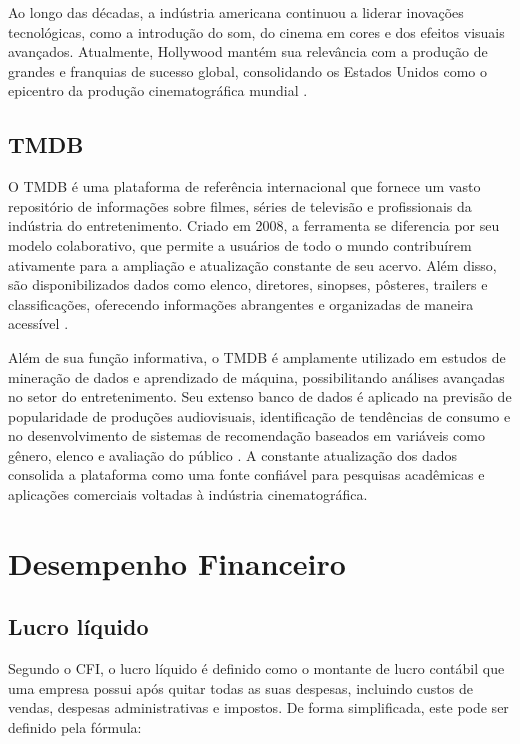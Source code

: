 Ao longo das décadas, a indústria americana continuou a liderar inovações tecnológicas, como a introdução do som, do cinema em cores e dos efeitos visuais avançados. Atualmente, Hollywood mantém sua relevância com a produção de grandes  e franquias de sucesso global, consolidando os Estados Unidos como o epicentro da produção cinematográfica mundial \cite{wyatt1994high}. 


\subsection{\acrfull{TMDB}}
O \acrfull{TMDB} é uma plataforma de referência internacional que fornece um vasto repositório de informações sobre filmes, séries de televisão e profissionais da indústria do entretenimento. Criado em 2008, a ferramenta se diferencia por seu modelo colaborativo, que permite a usuários de todo o mundo contribuírem ativamente para a ampliação e atualização constante de seu acervo. Além disso, são disponibilizados dados como elenco, diretores, sinopses, pôsteres, trailers e classificações, oferecendo informações abrangentes e organizadas de maneira acessível \cite{tmdb2025}.

Além de sua função informativa, o \acrshort{TMDB} é amplamente utilizado em estudos de mineração de dados e aprendizado de máquina, possibilitando análises avançadas no setor do entretenimento. Seu extenso banco de dados é aplicado na previsão de popularidade de produções audiovisuais, identificação de tendências de consumo e no desenvolvimento de sistemas de recomendação baseados em variáveis como gênero, elenco e avaliação do público \cite{nycdatascience2024}\cite{cmu2021capstone}. A constante atualização dos dados consolida a plataforma como uma fonte confiável para pesquisas acadêmicas e aplicações comerciais voltadas à indústria cinematográfica.

\section{Desempenho Financeiro}
\subsection{Lucro líquido}
Segundo o \acrfull{CFI}\cite{cfiNetIncome}, o lucro líquido é definido como o montante de lucro contábil que uma empresa possui após quitar todas as suas despesas, incluindo custos de vendas, despesas administrativas e impostos. De forma simplificada, este pode ser definido pela fórmula:


